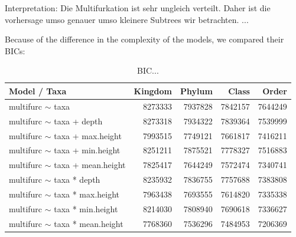         Interpretation: Die Multifurkation ist sehr ungleich verteilt. Daher ist die vorhersage umso 
          genauer umso kleinere Subtrees wir betrachten. ...
        
        Because of the difference in the complexity of the models, we compared their BICs:
        \begin{table}[h]
          \begin{center}
            \begin{tabular}{ |l|r|r|r|r| }
              \hline
              Model / Taxa & Kingdom & Phylum & Class & Order \\
              \hline \hline
              multifurc $\sim$ taxa & 8273333 & \cellcolor{green!15}7937828 & \cellcolor{green!20}7842157 & \cellcolor{green!30}7644249\\
              \hline
              multifurc $\sim$ taxa + depth & 8273318 & \cellcolor{green!15}7934322 & \cellcolor{green!20}7839364 & \cellcolor{green!35}7539999 \\
              multifurc $\sim$ taxa + max.height & \cellcolor{green!15}7993515 & \cellcolor{green!25}7749121 & \cellcolor{green!30}7661817 & \cellcolor{green!40}7416211 \\
              multifurc $\sim$ taxa + min.height & 8251211 & \cellcolor{green!20}7875521  & \cellcolor{green!25}7778327 & \cellcolor{green!35}7516883 \\
              multifurc $\sim$ taxa + mean.height & \cellcolor{green!20}7825417 & \cellcolor{green!30}7644249 & \cellcolor{green!35}7572474 & \cellcolor{green!45}7340741 \\
              \hline
              multifurc $\sim$ taxa * depth & 8235932 & \cellcolor{green!20}7836755 & \cellcolor{green!25}7757688 & \cellcolor{green!45}7383808 \\
              multifurc $\sim$ taxa * max.height & \cellcolor{green!15}7963438 & \cellcolor{green!30}7693555 & \cellcolor{green!30}7614820 & \cellcolor{green!45}7335338 \\
              multifurc $\sim$ taxa * min.height & 8214030 & \cellcolor{green!20}7808940 & \cellcolor{green!30}7690618 & \cellcolor{green!45}7336627\\
              multifurc $\sim$ taxa * mean.height & \cellcolor{green!25}7768360 & \cellcolor{green!35}7536296 & \cellcolor{green!50}7484953 & \cellcolor{green!50}7206369 \\
              \hline
            \end{tabular} 
          \end{center}
          \caption{BIC...}
          \label{table:...} 
        \end{table}

